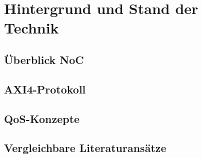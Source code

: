 \chapter{Hintergrund und Stand der Technik}

\section{Überblick NoC}

\section{AXI4-Protokoll}

\section{QoS-Konzepte}

\section{Vergleichbare Literaturansätze}